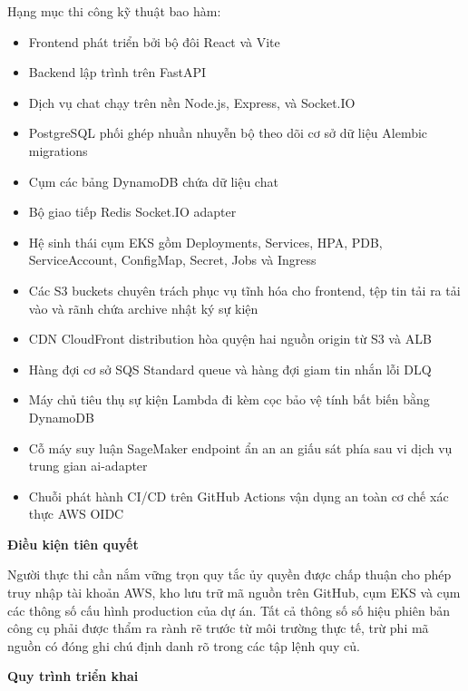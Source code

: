 Hạng mục thi công kỹ thuật bao hàm:

\begin{itemize}
\tightlist
\item
  Frontend phát triển bởi bộ đôi React và Vite
\item
  Backend lập trình trên FastAPI
\item
  Dịch vụ chat chạy trên nền Node.js, Express, và Socket.IO
\item
  PostgreSQL phối ghép nhuần nhuyễn bộ theo dõi cơ sở dữ liệu Alembic
  migrations
\item
  Cụm các bảng DynamoDB chứa dữ liệu chat
\item
  Bộ giao tiếp Redis Socket.IO adapter
\item
  Hệ sinh thái cụm EKS gồm Deployments, Services, HPA, PDB,
  ServiceAccount, ConfigMap, Secret, Jobs và Ingress
\item
  Các S3 buckets chuyên trách phục vụ tĩnh hóa cho frontend, tệp tin tải
  ra tải vào và rãnh chứa archive nhật ký sự kiện
\item
  CDN CloudFront distribution hòa quyện hai nguồn origin từ S3 và ALB
\item
  Hàng đợi cơ sở SQS Standard queue và hàng đợi giam tin nhắn lỗi DLQ
\item
  Máy chủ tiêu thụ sự kiện Lambda đi kèm cọc bảo vệ tính bất biến bằng
  DynamoDB
\item
  Cỗ máy suy luận SageMaker endpoint ẩn an an giấu sát phía sau vi dịch
  vụ trung gian ai-adapter
\item
  Chuỗi phát hành CI/CD trên GitHub Actions vận dụng an toàn cơ chế xác
  thực AWS OIDC
\end{itemize}

\vspace{0.5em}\noindent\textbf{Điều kiện tiên
quyết}\par

Người thực thi cần nắm vững trọn quy tắc ủy quyền được chấp thuận cho
phép truy nhập tài khoản AWS, kho lưu trữ mã nguồn trên GitHub, cụm EKS
và cụm các thông số cấu hình production của dự án. Tất cả thông số số
hiệu phiên bản công cụ phải được thẩm ra rành rẽ trước từ môi trường
thực tế, trừ phi mã nguồn có đóng ghi chú định danh rõ trong các tập
lệnh quy củ.

\vspace{0.5em}\noindent\textbf{Quy trình triển khai}\par

